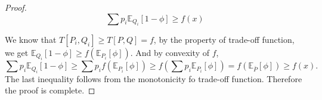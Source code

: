 \documentclass{article}
\begin{document}
\begin{lemma}
\begin{proof}
    \begin{equation*}
        \sum p_i \mathbb{E}_{Q_i}[1-\phi] \ge f(x)
    \end{equation*}
   
    We know that $T[P_i,Q_i] \ge T[P,Q] =f$, by the property of trade-off function, we get $\mathbb{E}_{Q_i}[1-\phi] \ge f(\mathbb{E}_{P_i}[\phi])$. And by convexity of $f$, 
    \begin{equation*}
        \sum p_i \mathbb{E}_{Q_i}[1-\phi] \ge \sum p_i f(\mathbb{E}_{P_i}[\phi]) \ge f\left( \sum p_i\mathbb{E}_{P_i}[\phi]\right) = f(\mathbb{E}_{\bar{P}}[\phi]) \ge f(x).
    \end{equation*}
    The last inequality follows from the monotonicity fo trade-off function. Therefore the proof is complete.
    \end{proof}
\end{lemma}
\end{document}
